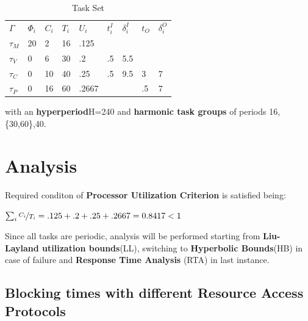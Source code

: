 \documentclass{article}
\begin{document}
\begin{table}[H]                                    \label{tab_set}
  \centering
  \begin{tabular}{lllllllll}
    $\Gamma$ &   $\Phi_{i}$ & $C_{i}$ & $T_{i}$ & $U_{i}$ & $t_{i}^{I}$ & $\delta_{i}^{I}$ & $t_{O}$ & $\delta_{i}^{O}$\\
    \cmidrule(r){2-5}
    \cmidrule(r){6-7}
    \cmidrule(r){8-9}
    $\tau_{M}$ & 20  &  2 &         16 &    .125 &     &       &           &           \\
    $\tau_{V}$ & 0   &  6 &         30 &    .2 &     .5 &   5.5 &            &      \\
    $\tau_{C}$ & 0   &  10 &        40 &    .25 &     .5 &   9.5  &          3 &      7\\
    $\tau_{P}$ & 0   &  16 &        60 &    .2667 &       &       &          .5 &     7\\
    \bottomrule
  \end{tabular}
  \medskip{}
  \caption{Task Set}
  \medskip{}
\end{table}

with an \textbf{hyperperiod}H=240 and \textbf{harmonic task groups} of periods 16,\{30,60\},40.




\section{Analysis}                      \label{analysis}

Required conditon of \textbf{Processor Utilization Criterion} is satisfied being:

\begin{center}
 $\sum_i \nicefrac{C_{i}}{T_{i}} = .125 + .2 + .25 + .2667 = 0.8417 < 1$
\end{center}

Since all tasks are periodic, analysis will be performed starting from \textbf{Liu-Layland utilization bounds}(LL), switching to \textbf{Hyperbolic Bounds}(HB) in case of failure and \textbf{Response Time Analysis} (RTA) in last instance.

\subsection{Blocking times with different Resource Access Protocols}    \label{blocking}
\end{document}
